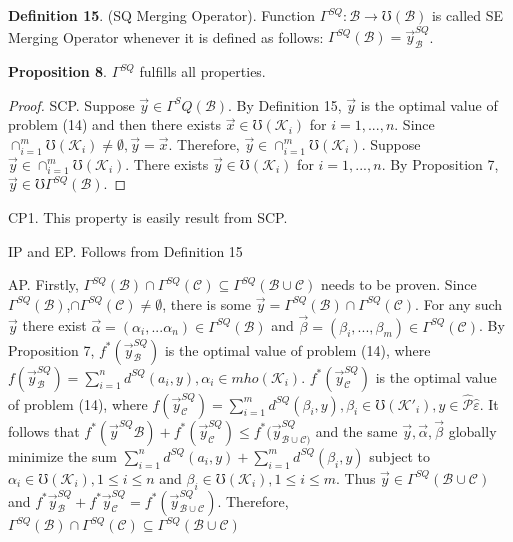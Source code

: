 \documentclass[]{iosart2c}
\begin{document}
    \textbf{Definition 15}. (SQ Merging Operator). Function $\Gamma^{SQ} : \mathcal{B} \to \mho (\mathcal{B})$ is called SE Merging Operator whenever it is defined as follows:
    $\Gamma^{SQ}(\mathcal{B}) = \vec{y}^{SQ}_\mathcal{B}$.

    \textbf{Proposition 8}. $\Gamma^{SQ}$ fulfills all properties.

    \begin{proof}
        SCP. Suppose $\vec{y} \in \Gamma^SQ(\mathcal{B})$. By Definition 15, $\vec{y}$ is the optimal value of problem (14) and then there exists $\vec{x} \in \mho(\mathcal{K}_i)$ for $i = 1, ... , n$. Since $\cap^m_{i=1}\mho(\mathcal{K}_i) \neq \emptyset, \vec{y} = \vec{x}$. Therefore, $\vec{y} \in \cap^m_{i=1}\mho(\mathcal{K}_i)$. Suppose $\vec{y} \in \cap^m_{i=1}\mho(\mathcal{K}_i)$. There exists $\vec{y} \in \mho(\mathcal{K}_i)$ for $i = 1, ... , n$. By Proposition 7, $\vec{y} \in \mho\Gamma^{SQ}(\mathcal{B})$.
    \end{proof}


    CP1. This property is easily result from SCP.

    IP and EP. Follows from Definition 15

    AP. Firstly, $\Gamma^{SQ}(\mathcal{B}) \cap \Gamma^{SQ}(\mathcal{C}) \subseteq \Gamma^{SQ}(\mathcal{B} \cup \mathcal{C})$ needs to be proven. Since $\Gamma^{SQ}(\mathcal{B})$,$\cap\Gamma^{SQ}(\mathcal{C}) \neq \emptyset$, there is some $\vec{y} = \Gamma^{SQ}(\mathcal{B}) \cap \Gamma^{SQ}(\mathcal{C})$. For any such $\vec{y}$ there exist $\vec{\alpha} = (\alpha_i, ... \alpha_n) \in \Gamma^{SQ}(\mathcal{B})$ and $\vec{\beta}= (\beta_i, ... , \beta_m) \in \Gamma^{SQ}(\mathcal{C})$. By Proposition 7, $f^*(\vec{y}^{SQ}_\mathcal{B})$ is the optimal value of problem (14), where $f(\vec{y}^{SQ}_\mathcal{B} ) = \sum^n_{i=1} d^{SQ}(a_i, y), \alpha_i \in mho(\mathcal{K}_i)$. $f^*(\vec{y}^{SQ}_\mathcal{C} )$ is the optimal value of problem (14), where $f (\vec{y}^{SQ}_\mathcal{C} ) = \sum^m_{i=1} d^{SQ}(\beta_i, y), \beta_i \in \mho(\mathcal{K}'_i), y \in \hat{\mathcal{P}} {\hat{\varepsilon}}$. It follows that $f^*(\vec{y}^{SQ} \mathcal{B} ) + f^*(\vec{y}^{SQ}_\mathcal{C} ) \le f^*(\vec{y}^{SQ}_{\mathcal{B}\cup\mathcal{C})}$ and the same $\vec{y}, \vec{\alpha}, \vec{\beta}$ globally minimize the sum $\sum^n_{i=1} d^{SQ}(a_i, y) +\sum^m_{i=1} d^{SQ}(\beta_i, y)$ subject to $\alpha_i \in \mho(\mathcal{K}_i), 1 \le i \le n$ and $\beta_i \in \mho(\mathcal{K}_i), 1 \le i \le m$. Thus $\vec{y} \in \Gamma^{SQ}(\mathcal{B} \cup \mathcal{C})$ and $f^*\vec{y}^{SQ}_\mathcal{B} + f^*\vec{y}^{SQ}_\mathcal{C} = f^*(\vec{y}^{SQ}_{\mathcal{B}\cup\mathcal{C}})$. Therefore, $\Gamma^{SQ}(\mathcal{B}) \cap \Gamma^{SQ}(\mathcal{C}) \subseteq \Gamma^{SQ}(\mathcal{B} \cup \mathcal{C})$
\end{document}
